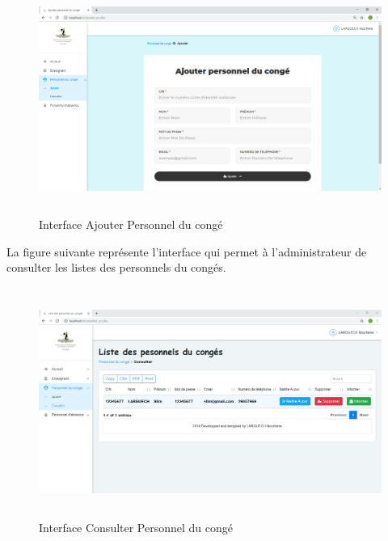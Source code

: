 \documentclass[12 pt ]{report}
\begin{document}
\begin{figure}[h]
 \begin{center}
\includegraphics[width= 18 cm ,height=  7.5cm]{ajouter_pc.PNG}
\caption{Interface Ajouter Personnel du congé}

\end{center}
\end{figure}
\newpage

La figure suivante représente l'interface qui permet à l'administrateur de consulter les listes des personnels du congés.
\begin{figure}[h]
 \begin{center}
\includegraphics[width= 16 cm ,height=  7.5cm]{consulter_pc.PNG}
\caption{Interface Consulter Personnel du congé}

\end{center}
\end{figure}\\
\end{document}
